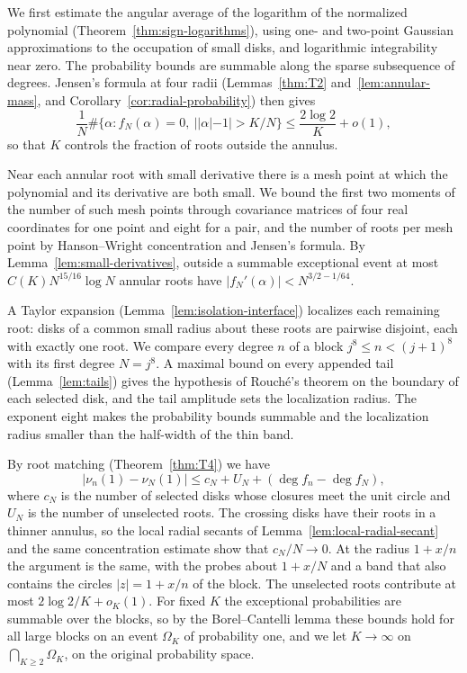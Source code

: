 \documentclass[12pt,leqno,twoside]{article}
\theoremstyle{named}
\theoremstyle{remark}
\begin{document}
We first estimate the angular average of the logarithm of the normalized
polynomial (Theorem~\ref{thm:sign-logarithms}), using one- and two-point
Gaussian approximations to the occupation of small disks, and logarithmic
integrability near zero. The probability bounds are summable along the
sparse subsequence of degrees. Jensen's formula at four radii
(Lemmas~\ref{thm:T2} and~\ref{lem:annular-mass}, and
Corollary~\ref{cor:radial-probability}) then gives
\[
 \frac1N\#\{\alpha:f_N(\alpha)=0,\ ||\alpha|-1|>K/N\}
 \le\frac{2\log2}{K}+o(1),
\]
so that $K$ controls the fraction of roots outside the annulus.

Near each annular root with small derivative there is a mesh point at
which the polynomial and its derivative are both small. We bound the
first two moments of the number of such mesh points through covariance
matrices of four real coordinates for one point and eight for a pair,
and the number of roots per mesh point by Hanson--Wright concentration
and Jensen's formula. By Lemma~\ref{lem:small-derivatives}, outside a
summable exceptional event at most $C(K)N^{15/16}\log N$ annular roots
have $|f_N'(\alpha)|<N^{3/2-1/64}$.

A Taylor expansion (Lemma~\ref{lem:isolation-interface}) localizes each
remaining root: disks of a common small radius about these roots are
pairwise disjoint, each with exactly one root. We compare every degree
$n$ of a block $j^8\le n<(j+1)^8$ with its first degree $N=j^8$. A
maximal bound on every appended tail (Lemma~\ref{lem:tails}) gives the
hypothesis of Rouch\'e's theorem on the boundary of each selected disk,
and the tail amplitude sets the localization radius. The exponent eight
makes the probability bounds summable and the localization radius
smaller than the half-width of the thin band.

By root matching (Theorem~\ref{thm:T4}) we have
\[
 |\nu_n(1)-\nu_N(1)|\le c_N+U_N+(\deg f_n-\deg f_N),
\]
where $c_N$ is the number of selected disks whose closures meet the
unit circle and $U_N$ is the number of unselected roots.
The crossing disks have their roots in a thinner annulus, so the local
radial secants of Lemma~\ref{lem:local-radial-secant} and the same
concentration estimate show that $c_N/N\to0$. At the radius $1+x/n$ the
argument is the same, with the probes about $1+x/N$ and a band that also
contains the circles $|z|=1+x/n$ of the block. The unselected roots
contribute at most $2\log2/K+o_K(1)$. For fixed $K$ the exceptional
probabilities are summable over the blocks, so by the Borel--Cantelli
lemma these bounds hold for all large blocks on an event $\Omega_K$ of
probability one, and we let $K\to\infty$ on $\bigcap_{K\ge2}\Omega_K$,
on the original probability space.
\end{document}
